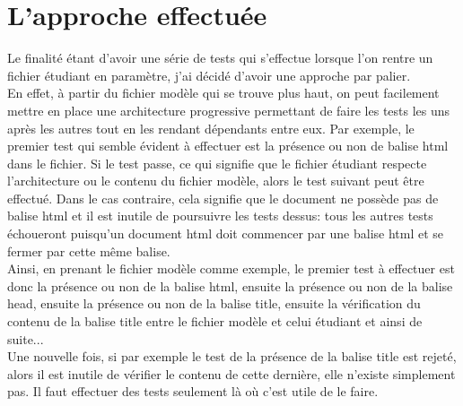 \documentclass[12pt,twoside]{report}
\begin{document}
\section{L'approche effectuée}
Le finalité étant d'avoir une série de tests qui s'effectue lorsque l'on rentre un fichier étudiant en paramètre, j'ai décidé d'avoir une approche par palier.\\ En effet, à partir du fichier modèle qui se trouve plus haut, on peut facilement mettre en place une architecture progressive permettant de faire les tests les uns après les autres tout en les rendant dépendants entre eux. Par exemple, le premier test qui semble évident à effectuer est la présence ou non de balise html dans le fichier. Si le test passe, ce qui signifie que le fichier étudiant respecte l'architecture ou le contenu du fichier modèle, alors le test suivant peut être effectué. Dans le cas contraire, cela signifie que le document ne possède pas de balise html et il est inutile de poursuivre les tests dessus: tous les autres tests échoueront puisqu'un document html doit commencer par une balise html et se fermer par cette même balise.\\
Ainsi, en prenant le fichier modèle comme exemple, le premier test à effectuer est donc la présence ou non de la balise html, ensuite la présence ou non de la balise head, ensuite la présence ou non de la balise title, ensuite la vérification du contenu de la balise title entre le fichier modèle et celui étudiant et ainsi de suite...\\
Une nouvelle fois, si par exemple le test de la présence de la balise title est rejeté, alors il est inutile de vérifier le contenu de cette dernière, elle n'existe simplement pas. Il faut effectuer des tests seulement là où c'est utile de le faire.
\end{document}
